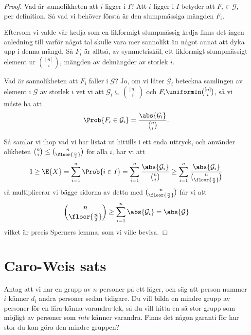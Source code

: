 \documentclass[nobib]{tufte-handout}
\begin{document}
\begin{lemma}
\begin{proof}
        Vad är sannolikheten att $i$ ligger i $I$? Att $i$ ligger i $I$ betyder att $F_i \in \mathcal{G}$, per definition. Så vad vi behöver förstå är den slumpmässiga mängden $F_i$.

        Eftersom vi valde vår kedja som en likformigt slumpmässig kedja finns det ingen anledning till varför något tal skulle vara mer sannolikt än något annat att dyka upp i denna mängd. Så $F_i$ är alltså, av symmetriskäl, ett likformigt slumpmässigt element ur $\binom{[n]}{i}$, mängden av delmängder av storlek $i$.

        Vad är sannolikheten att $F_i$ faller i $\mathcal{G}$? Jo, om vi låter $\mathcal{G}_i$ beteckna samlingen av element i $\mathcal{G}$ av storlek $i$ vet vi att $\mathcal{G}_i \subseteq \binom{[n]}{i}$  och $F_i \uniformIn \binom{[n]}{i}$, så vi måste ha att
        $$\Prob{F_i \in \mathcal{G}_i} = \frac{\abs{\mathcal{G}_i}}{\binom{n}{i}}.$$

        Så samlar vi ihop vad vi har listat ut hittills i ett enda uttryck, och använder olikheten $\binom{n}{i} \leq \binom{n}{\floor{\frac{n}{2}}}$ för alla $i$, har vi att
        $$1 \geq \E{X} = \sum_{i=1}^{n} \Prob{i \in I} = \sum_{i=1}^{n} \frac{\abs{\mathcal{G}_i}}{\binom{n}{i}} \geq \sum_{i=1}^{n} \frac{\abs{\mathcal{G}_i}}{\binom{n}{\floor{\frac{n}{2}}}}$$
        så multiplicerar vi bägge sidorna av detta med $\binom{n}{\floor{\frac{n}{2}}}$ får vi att
        $$\binom{n}{\floor{\frac{n}{2}}} \geq \sum_{i=1}^{n} \abs{\mathcal{G}_i} = \abs{\mathcal{G}}$$
        vilket är precis Sperners lemma, som vi ville bevisa.
    \end{proof}
\end{lemma}

\section{Caro-Weis sats}

Antag att vi har en grupp av $n$ personer på ett läger, och säg att person nummer $i$ känner $d_i$ andra personer sedan tidigare. Du vill bilda en mindre grupp av personer för en lära-känna-varandra-lek, så du vill hitta en så stor grupp som möjligt av personer som \emph{inte} känner varandra. Finns det någon garanti för hur stor du kan göra den mindre gruppen?
\end{document}
